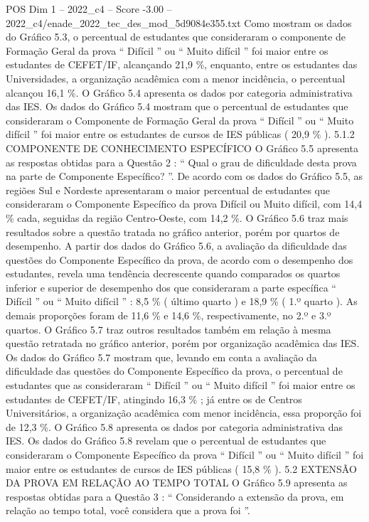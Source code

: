 \begin{textsample}{POS Dim 1 – 2022\_c4 – Score -3.00 – 2022\_c4/enade\_2022\_tec\_des\_mod\_5d9084e355.txt}
Como mostram os dados do Gráfico 5.3, o percentual de estudantes que consideraram o componente de Formação Geral da prova “ Difícil ” ou “ Muito difícil ” foi maior entre os estudantes de CEFET/IF, alcançando 21,9 \%, enquanto, entre os estudantes das Universidades, a organização acadêmica com a menor incidência, o percentual alcançou 16,1 \%.
O Gráfico 5.4 apresenta os dados por categoria administrativa das IES.
Os dados do Gráfico 5.4 mostram que o percentual de estudantes que consideraram o Componente de Formação Geral da prova “ Difícil ” ou “ Muito difícil ” foi maior entre os estudantes de cursos de IES públicas ( 20,9 \% ). 5.1.2 COMPONENTE DE CONHECIMENTO ESPECÍFICO O Gráfico 5.5 apresenta as respostas obtidas para a Questão 2 : “ Qual o grau de dificuldade desta prova na parte de Componente Específico? ”.
De acordo com os dados do Gráfico 5.5, as regiões Sul e Nordeste apresentaram o maior percentual de estudantes que consideraram o Componente Específico da prova Difícil ou Muito difícil, com 14,4 \% cada, seguidas da região Centro-Oeste, com 14,2 \%.
O Gráfico 5.6 traz mais resultados sobre a questão tratada no gráfico anterior, porém por quartos de desempenho.
A partir dos dados do Gráfico 5.6, a avaliação da dificuldade das questões do Componente Específico da prova, de acordo com o desempenho dos estudantes, revela uma tendência decrescente quando comparados os quartos inferior e superior de desempenho dos que consideraram a parte específica “ Difícil ” ou “ Muito difícil ” : 8,5 \% ( último quarto ) e 18,9 \% ( 1.º quarto ).
As demais proporções foram de 11,6 \% e 14,6 \%, respectivamente, no 2.º e 3.º quartos.
O Gráfico 5.7 traz outros resultados também em relação à mesma questão retratada no gráfico anterior, porém por organização acadêmica das IES.
Os dados do Gráfico 5.7 mostram que, levando em conta a avaliação da dificuldade das questões do Componente Específico da prova, o percentual de estudantes que as consideraram “ Difícil ” ou “ Muito difícil ” foi maior entre os estudantes de CEFET/IF, atingindo 16,3 \% ; já entre os de Centros Universitários, a organização acadêmica com menor incidência, essa proporção foi de 12,3 \%.
O Gráfico 5.8 apresenta os dados por categoria administrativa das IES.
Os dados do Gráfico 5.8 revelam que o percentual de estudantes que consideraram o Componente Específico da prova “ Difícil ” ou “ Muito difícil ” foi maior entre os estudantes de cursos de IES públicas ( 15,8 \% ). 5.2 EXTENSÃO DA PROVA EM RELAÇÃO AO TEMPO TOTAL O Gráfico 5.9 apresenta as respostas obtidas para a Questão 3 : “ Considerando a extensão da prova, em relação ao tempo total, você considera que a prova foi ”.

\end{textsample}
